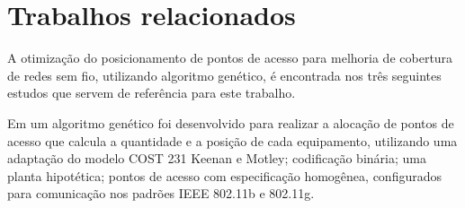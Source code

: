 \documentclass[tc,twoside]{iiufrgs}
\begin{document}












\chapter{Trabalhos relacionados} 

A otimização do posicionamento de pontos de acesso para melhoria de cobertura de redes sem fio, utilizando algoritmo genético, é encontrada nos três seguintes estudos que servem de referência para este trabalho.

Em \cite{ji2002methods} um algoritmo genético foi desenvolvido para realizar a alocação de pontos de acesso que calcula a quantidade e a posição de cada equipamento, utilizando uma adaptação do modelo COST 231 Keenan e Motley; codificação binária; uma planta hipotética; pontos de acesso com especificação homogênea, configurados para comunicação nos padrões IEEE 802.11b e 802.11g.
\end{document}
